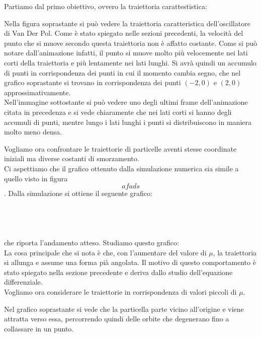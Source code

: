 \documentclass[12pt]{article}
\begin{document}
Partiamo dal primo obiettivo, ovvero la traiettoria carattestistica: 
\begin{figure}[H]
	\centering
	\scalebox{0.9}{}
\end{figure}
Nella figura soprastante si può vedere la traiettoria caratteristica dell'oscillatore di Van Der Pol. Come è stato spiegato nelle sezioni precedenti, la velocità del punto che si muove secondo questa traiettoria non è affatto costante.
Come si può notare dall'animazione infatti, il punto si muove molto più velocemente nei lati corti della traiettoria e più lentamente nei lati lunghi. Si avrà quindi un accumulo di punti in corrispondenza dei punti in cui il momento cambia segno,
che nel grafico soprastante si trovano in corrispondenza dei punti $(-2,0)$ e $(2,0)$ approssimativamente. \\
Nell'immagine sottostante si può vedere uno degli ultimi frame dell'animazione citata in precedenza e si vede chiaramente che nei lati corti si hanno degli accumuli di punti, mentre lungo i lati lunghi i punti si distribuiscono in maniera molto meno densa. 
\begin{figure}[H]
	\centering
	
\end{figure}
Vogliamo ora confrontare le traiettorie di particelle aventi stesse coordinate iniziali ma diverse costanti di smorzamento. \\
Ci aspettiamo che il grafico ottenuto dalla simulazione numerica sia simile a quello visto in figura $$ afads $$. Dalla simulazione si ottiene il seguente grafico: \\ \\ \\ \\ \\
che riporta l'andamento atteso. Studiamo questo grafico: \\
La cosa principale che si nota è che, con l'aumentare del valore di $\mu$, la traiettoria si allunga e assume una forma pià angolata. Il motivo di questo comportamento è stato spiegato nella sezione precedente e deriva dallo studio dell'equazione differenziale. \\
Vogliamo ora considerare le traiettorie in corrispondenza di valori piccoli di $\mu$. 
\begin{figure}[H]
	\centering
	
\end{figure}
Nel grafico soprastante si vede che la particella parte vicino all'origine e viene attratta verso essa, percorrendo quindi delle orbite che degenerano fino a collassare in un punto.
\end{document}
